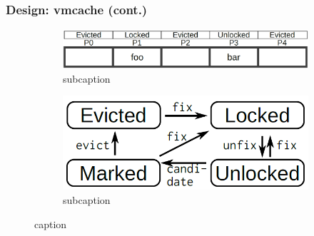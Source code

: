 \documentclass[10pt,aspectratio=169,mathserif]{beamer}
\begin{document}
\begin{frame}
	\frametitle{Design: vmcache (cont.)}
	\begin{figure}[htp]
		\centering
		\begin{subfigure}[!t]{0.65\linewidth}
			\includegraphics[width=\linewidth]{./images/states.png}
			\caption{subcaption}
		\end{subfigure}
		\begin{subfigure}[!t]{0.28\linewidth}
			\includegraphics[width=\linewidth]{./images/transfer.png}
			\caption{subcaption}
		\end{subfigure}
		\caption{caption}
	\end{figure}
\end{frame}


\end{document}
